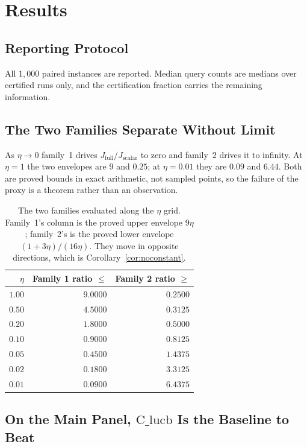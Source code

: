 \documentclass[conference]{IEEEtran}
\theoremstyle{definition}
\begin{document}
\section{Results}
\label{sec:results}

\subsection{Reporting Protocol}

All $1{,}000$ paired instances are reported. Median query counts are medians over certified
runs only, and the certification fraction carries the remaining information.

\subsection{The Two Families Separate Without Limit}

As $\eta\to0$ family~1 drives $J_{\mathrm{full}}/J_{\mathrm{scalar}}$ to zero and family~2
drives it to infinity. At $\eta=1$ the two envelopes are $9$ and $0.25$; at $\eta=0.01$ they
are $0.09$ and $6.44$. Both are proved bounds in exact arithmetic, not sampled points, so the
failure of the proxy is a theorem rather than an observation.

\begin{table}[htbp]
\caption{The two families evaluated along the $\eta$ grid. Family~1's column is the proved
upper envelope $9\eta$; family~2's is the proved lower envelope $(1+3\eta)/(16\eta)$. They
move in opposite directions, which is Corollary~\ref{cor:noconstant}.}
\label{tab:families}
\centering
\footnotesize
\begin{tabular}{@{}rrr@{}}
\toprule
$\eta$ & Family 1 ratio $\le$ & Family 2 ratio $\ge$ \\
\midrule
$1.00$ & $9.0000$ & $0.2500$ \\
$0.50$ & $4.5000$ & $0.3125$ \\
$0.20$ & $1.8000$ & $0.5000$ \\
$0.10$ & $0.9000$ & $0.8125$ \\
$0.05$ & $0.4500$ & $1.4375$ \\
$0.02$ & $0.1800$ & $3.3125$ \\
$0.01$ & $0.0900$ & $6.4375$ \\
\bottomrule
\end{tabular}
\end{table}

\subsection{On the Main Panel, $\mathrm{C\_lucb}$ Is the Baseline to Beat}
\end{document}

